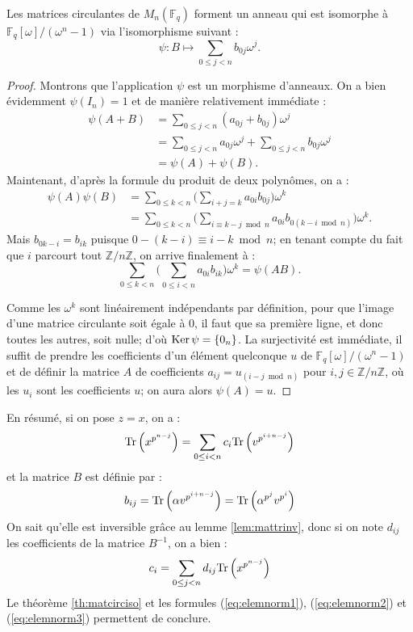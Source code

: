 \documentclass[a4paper]{article} %
\numberwithin{section}{part}
\numberwithin{equation}{section}
\newcommand\zmodn[1]{\mathbb{Z}/#1\mathbb{Z}}
\newcommand\GF[1]{\mathbb{F}_{#1}}
\newcommand\Tr[1]{\textup{Tr}\left(#1\right)}
\begin{document}
\begin{thm}
\label{th:matcirciso}
Les matrices circulantes de $M_n(\GF{q})$ forment un anneau qui est isomorphe à 
$\mathbb{F}_q[\omega]/(\omega^n - 1)$ \textup{via} l'isomorphisme suivant :
\begin{equation*}
\label{eq:isomconvert}
\psi : B \longmapsto \sum_{0\leq j < n}{b_{0j}\omega^j}.
\end{equation*}
\end{thm}
\begin{proof}
Montrons que l'application $\psi$ est un morphisme d'anneaux. On a bien 
évidemment $\psi(I_n) = 1$ et de manière relativement immédiate :
\begin{align*}
\psi(A + B) &= \sum_{0\leq j < n}{(a_{0j} + b_{0j})\omega^j}\\
&= \sum_{0\leq j < n}{a_{0j}\omega^j} + \sum_{0\leq j < n}{b_{0j}\omega^j}\\
&= \psi(A) + \psi(B).
\end{align*}
Maintenant, d'après la formule du produit de deux polynômes, on a :
\begin{align*}
\psi(A)\psi(B) &= \sum_{0\leq k < n}
{\bigg(\sum_{i+j=k}{a_{0i}b_{0j}}\bigg)\omega^k}\\
&= \sum_{0\leq k < n}{\bigg(\sum_{i\equiv k-j \bmod n}{a_{0i}b_{0(k-i \bmod n)}}
\bigg)\omega^k}.
\end{align*}
Mais $b_{0k-i} = b_{ik}$ puisque $0 -(k-i) \equiv i-k \bmod n$; en tenant compte
du fait que $i$ parcourt tout $\zmodn{n}$, on arrive finalement à :
\[\sum_{0\leq k < n}{\bigg(\sum_{0\leq i < n}{a_{0i}b_{ik}}\bigg)\omega^k} = 
\psi(AB).\]\par
Comme les $\omega^k$ sont linéairement indépendants par définition, pour que 
l'image d'une matrice circulante soit égale à $0$, il faut que sa première 
ligne, et donc toutes les autres, soit nulle; d'où $\textup{Ker}\,\psi = 
\{0_n\}$. La surjectivité est immédiate, il suffit de prendre les coefficients 
d'un élément quelconque $u$ de $\GF{q}[\omega]/(\omega^n - 1)$ et de définir la 
matrice $A$ de coefficients $a_{ij} = u_{(i-j \bmod n)}$ pour $i,j\in\zmodn{n}$,
où les $u_i$ sont les coefficients $u$; on aura alors $\psi(A) = u$.
\end{proof}
En résumé, si on pose $z = x$, on a :
\[\textup{Tr}\left(x^{p^{n-j}}\right) = \sum_{0\leq i < n}{c_i\textup{Tr}
\left(v^{p^{i+n-j}}\right)}\]
et la matrice $B$ est définie par :
\[b_{ij} = \Tr{\alpha v^{p^{i+n-j}}} = \Tr{\alpha^{p^j}v^{p^i}}\]
On sait qu'elle est inversible grâce au lemme \ref{lem:mattrinv}, donc si on
note $d_{ij}$ les coefficients de la matrice $B^{-1}$, on a bien :
\[c_i = \sum_{0\leq j < n}{d_{ij}\textup{Tr}\left(x^{p^{n-j}}\right)}\]
Le théorème \ref{th:matcirciso} et les formules (\ref{eq:elemnorm1}),
(\ref{eq:elemnorm2}) et (\ref{eq:elemnorm3}) permettent de conclure.
\end{document}
